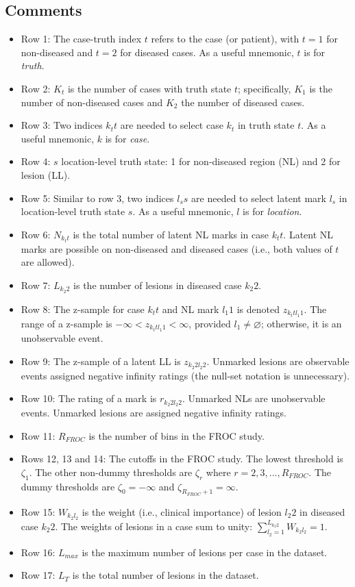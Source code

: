 \documentclass[
]{book}
\begin{document}
\hypertarget{comments}{%
\subsection{Comments}\label{comments}}

\begin{itemize}
\item
  Row 1: The case-truth index \(t\) refers to the case (or patient), with \(t = 1\) for non-diseased and \(t = 2\) for diseased cases. As a useful mnemonic, \(t\) is for \emph{truth}.
\item
  Row 2: \(K_t\) is the number of cases with truth state \(t\); specifically, \(K_1\) is the number of non-diseased cases and \(K_2\) the number of diseased cases.
\item
  Row 3: Two indices \(k_t t\) are needed to select case \(k_t\) in truth state \(t\). As a useful mnemonic, \(k\) is for \emph{case}.
\item
  Row 4: \(s\) location-level truth state: 1 for non-diseased region (NL) and 2 for lesion (LL).
\item
  Row 5: Similar to row 3, two indices \(l_s s\) are needed to select latent mark \(l_s\) in location-level truth state \(s\). As a useful mnemonic, \(l\) is for \emph{location}.
\item
  Row 6: \(N_{k_t t}\) is the total number of latent NL marks in case \(k_t t\). Latent NL marks are possible on non-diseased and diseased cases (i.e., both values of \(t\) are allowed).
\item
  Row 7: \(L_{k_2 2}\) is the number of lesions in diseased case \(k_2 2\).
\item
  Row 8: The z-sample for case \(k_t t\) and NL mark \(l_1 1\) is denoted \(z_{k_t t l_1 1}\). The range of a z-sample is \(-\infty < z_{k_t t l_1 1} < \infty\), provided \(l_1 \neq \varnothing\); otherwise, it is an unobservable event.
\item
  Row 9: The z-sample of a latent LL is \(z_{k_2 2 l_2 2}\). Unmarked lesions are observable events assigned negative infinity ratings (the null-set notation is unnecessary).
\item
  Row 10: The rating of a mark is \(r_{k_2 2 l_2 2}\). Unmarked NLs are unobservable events. Unmarked lesions are assigned negative infinity ratings.
\item
  Row 11: \(R_{FROC}\) is the number of bins in the FROC study.
\item
  Rows 12, 13 and 14: The cutoffs in the FROC study. The lowest threshold is \(\zeta_1\). The other non-dummy thresholds are \(\zeta_r\) where \(r=2,3,...,R_{FROC}\). The dummy thresholds are \(\zeta_0 = -\infty\) and \(\zeta_{R_{FROC}+1} = \infty\).
\item
  Row 15: \(W_{k_2 l_2}\) is the weight (i.e., clinical importance) of lesion \(l_2 2\) in diseased case \(k_2 2\). The weights of lesions in a case sum to unity: \(\sum_{l_2 = 1}^{L_{k_2 2}}W_{k_2 l_2} = 1\).
\item
  Row 16: \(L_{max}\) is the maximum number of lesions per case in the dataset.
\item
  Row 17: \(L_T\) is the total number of lesions in the dataset.
\end{itemize}
\end{document}
